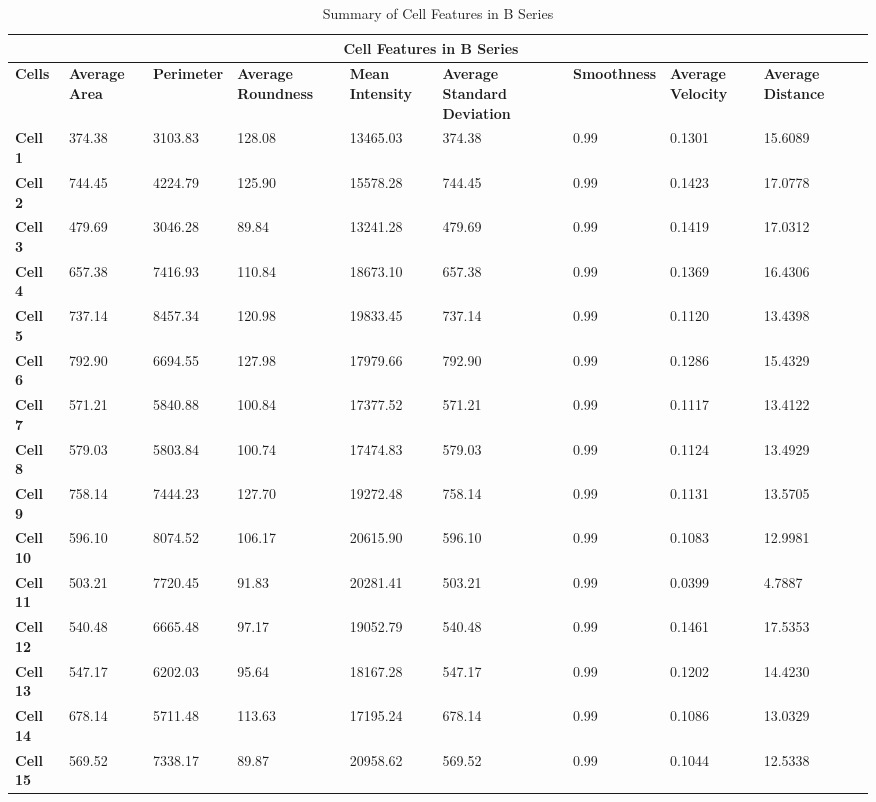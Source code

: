 \documentclass{article}
\begin{document}
\begin{table}[h!]
\centering
\caption{Summary of Cell Features in B Series}
\begin{tabular}{ |p{1.2cm}|p{1.5cm}|p{1.5cm}|p{1.7cm}|p{1.7cm}|p{1.7cm}|p{1.7cm}|p{1.7cm}|p{1.7cm}|p{1.7cm}| }
\hline
\multicolumn{9}{|c|}{\textbf{Cell Features in B Series}} \\
\hline
\textbf{Cells} & \textbf{Average Area} & \textbf{Perimeter} & \textbf{Average Roundness} & \textbf{Mean Intensity} & \textbf{Average Standard Deviation} & \textbf{Smoothness} & \textbf{Average Velocity} & \textbf{Average Distance} \\
\hline
\textbf{Cell 1} & 374.38 & 3103.83 & 128.08 & 13465.03 & 374.38 & 0.99 & 0.1301 & 15.6089\\
\textbf{Cell 2} & 744.45 & 4224.79 & 125.90 & 15578.28 & 744.45 & 0.99 & 0.1423 & 17.0778 \\
\textbf{Cell 3} & 479.69 & 3046.28 & 89.84 & 13241.28 & 479.69 & 0.99 & 0.1419 & 17.0312 \\
\textbf{Cell 4} & 657.38 & 7416.93 & 110.84 & 18673.10 & 657.38 & 0.99 & 0.1369 & 16.4306 \\
\textbf{Cell 5} & 737.14 & 8457.34 & 120.98 & 19833.45 & 737.14 & 0.99 & 0.1120 & 13.4398\\
\textbf{Cell 6} & 792.90 & 6694.55 & 127.98 & 17979.66 & 792.90 & 0.99 & 0.1286 & 15.4329\\
\textbf{Cell 7} & 571.21 & 5840.88 & 100.84 & 17377.52 & 571.21 & 0.99 & 0.1117 & 13.4122\\
\textbf{Cell 8} & 579.03 & 5803.84 & 100.74 & 17474.83 & 579.03 & 0.99 & 0.1124 & 13.4929\\
\textbf{Cell 9} & 758.14 & 7444.23 & 127.70 & 19272.48 & 758.14 & 0.99 & 0.1131 & 13.5705\\
\textbf{Cell 10} & 596.10 & 8074.52 & 106.17 & 20615.90 & 596.10 & 0.99 & 0.1083 & 12.9981\\
\textbf{Cell 11} & 503.21 & 7720.45 & 91.83 & 20281.41 & 503.21 & 0.99 & 0.0399 & 4.7887\\
\textbf{Cell 12} & 540.48 & 6665.48 & 97.17 & 19052.79 & 540.48 & 0.99 & 0.1461 & 17.5353\\
\textbf{Cell 13} & 547.17 & 6202.03 & 95.64 & 18167.28 & 547.17 & 0.99 & 0.1202 & 14.4230\\
\textbf{Cell 14} & 678.14 & 5711.48 & 113.63 & 17195.24 & 678.14 & 0.99 & 0.1086 &  13.0329\\
\textbf{Cell 15} & 569.52 & 7338.17 & 89.87 & 20958.62 & 569.52 & 0.99 & 0.1044 & 12.5338\\
\hline
\end{tabular}
\end{table}
\end{document}
